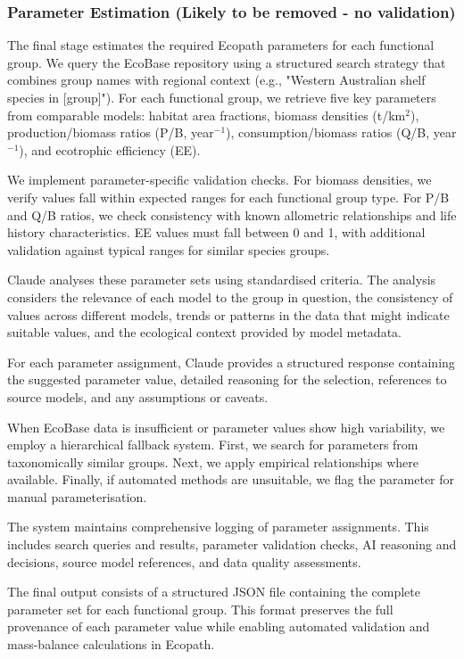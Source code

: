 \subsubsection{Parameter Estimation (Likely to be removed - no validation)}

The final stage estimates the required Ecopath \citep{Christensen2004} parameters for each functional group. We query the EcoBase repository \citep{Colleter2015} using a structured search strategy that combines group names with regional context (e.g., "Western Australian shelf species in [group]"). For each functional group, we retrieve five key parameters from comparable models: habitat area fractions, biomass densities (t/km$^2$), production/biomass ratios (P/B, year$^{-1}$), consumption/biomass ratios (Q/B, year$^{-1}$), and ecotrophic efficiency (EE).

We implement parameter-specific validation checks. For biomass densities, we verify values fall within expected ranges for each functional group type. For P/B and Q/B ratios, we check consistency with known allometric relationships and life history characteristics. EE values must fall between 0 and 1, with additional validation against typical ranges for similar species groups.

Claude \citep{Anthropic2024} analyses these parameter sets using standardised criteria. The analysis considers the relevance of each model to the group in question, the consistency of values across different models, trends or patterns in the data that might indicate suitable values, and the ecological context provided by model metadata.

For each parameter assignment, Claude provides a structured response containing the suggested parameter value, detailed reasoning for the selection, references to source models, and any assumptions or caveats.

When EcoBase data is insufficient or parameter values show high variability, we employ a hierarchical fallback system. First, we search for parameters from taxonomically similar groups. Next, we apply empirical relationships where available. Finally, if automated methods are unsuitable, we flag the parameter for manual parameterisation.

The system maintains comprehensive logging of parameter assignments. This includes search queries and results, parameter validation checks, AI reasoning and decisions, source model references, and data quality assessments.

The final output consists of a structured JSON file containing the complete parameter set for each functional group. This format preserves the full provenance of each parameter value while enabling automated validation and mass-balance calculations in Ecopath.

